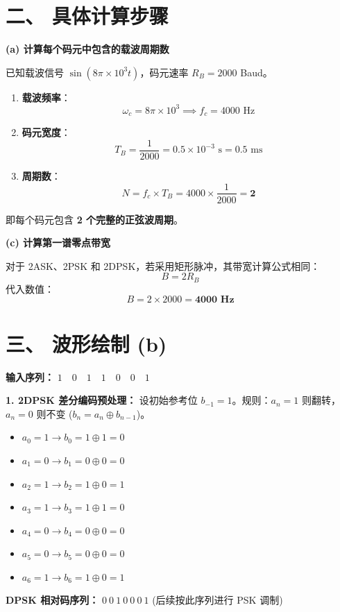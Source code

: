 \documentclass[a4paper,11pt]{ctexart}
\begin{document}
\begin{enumerate}[label=\textbf{7-\arabic*}]
\begin{tcolorbox}[colback=white, colframe=blue!50!black, title=\textbf{题目解答：7-1 二进制数字调制系统分析}]
    \end{tcolorbox}


    \section*{二、 具体计算步骤}
    
    \textbf{(a) 计算每个码元中包含的载波周期数}
    
    已知载波信号 $\sin(8\pi \times 10^3 t)$，码元速率 $R_B = 2000$ Baud。
    \begin{enumerate}
        \item \textbf{载波频率}：
            $$ \omega_c = 8\pi \times 10^3 \implies f_c = 4000 \text{ Hz} $$
        \item \textbf{码元宽度}：
            $$ T_B = \frac{1}{2000} = 0.5 \times 10^{-3} \text{ s} = 0.5 \text{ ms} $$
        \item \textbf{周期数}：
            $$ N = f_c \times T_B = 4000 \times \frac{1}{2000} = \mathbf{2} $$
    \end{enumerate}
    即每个码元包含 \textbf{2 个完整的正弦波周期}。
    
    \vspace{0.5cm}
    
    \textbf{(c) 计算第一谱零点带宽}
    
    对于 2ASK、2PSK 和 2DPSK，若采用矩形脉冲，其带宽计算公式相同：
    $$ B = 2 R_B $$
    代入数值：
    $$ B = 2 \times 2000 = \mathbf{4000 \text{ Hz}} $$

    \hrulefill
    
    \section*{三、 波形绘制 (b)}
    
    \textbf{输入序列：} $1 \quad 0 \quad 1 \quad 1 \quad 0 \quad 0 \quad 1$
    
    \textbf{1. 2DPSK 差分编码预处理：}
    设初始参考位 $b_{-1}=1$。规则：$a_n=1$ 则翻转，$a_n=0$ 则不变 ($b_n = a_n \oplus b_{n-1}$)。
    \begin{itemize}
        \item $a_0=1 \to b_0 = 1 \oplus 1 = 0$
        \item $a_1=0 \to b_1 = 0 \oplus 0 = 0$
        \item $a_2=1 \to b_2 = 1 \oplus 0 = 1$
        \item $a_3=1 \to b_3 = 1 \oplus 1 = 0$
        \item $a_4=0 \to b_4 = 0 \oplus 0 = 0$
        \item $a_5=0 \to b_5 = 0 \oplus 0 = 0$
        \item $a_6=1 \to b_6 = 1 \oplus 0 = 1$
    \end{itemize}
    \textbf{DPSK 相对码序列：} $0 \ 0 \ 1 \ 0 \ 0 \ 0 \ 1$ (后续按此序列进行 PSK 调制)
    

\end{enumerate}
\end{document}
